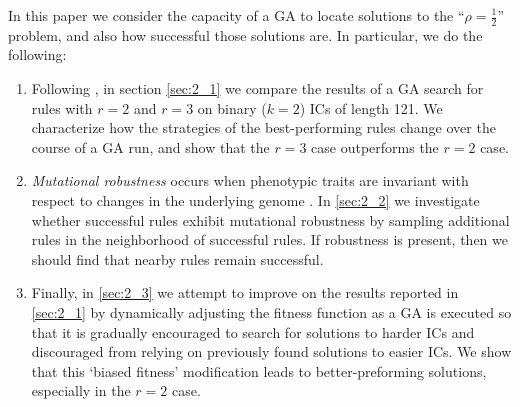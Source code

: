 In this paper we consider the capacity of a GA to locate solutions to the ``$\rho = \frac{1}{2}$'' problem, and also how successful those solutions are. In particular, we do the following: 
\begin{enumerate}
	\item Following \cite{Mitchell:1994:ECA:186092.186116}, in section \ref{sec:2_1} we compare the results of a GA search for rules 
	with $r = 2$ and $r = 3$ on binary ($k = 2$) 
	ICs of length 121. We characterize how the strategies of the best-performing rules change over the course of a GA run, 
	and show that the $r = 3$ case outperforms the $r = 2$ case.
	\item \textit{Mutational robustness} occurs when phenotypic traits are invariant with respect to changes in the underlying genome \cite{wagner_role_2012}.  
	In \ref{sec:2_2} we investigate whether successful rules exhibit mutational robustness by sampling additional rules in the neighborhood of successful rules. If robustness is present, then we should find that nearby rules remain successful.
	\item Finally, in \ref{sec:2_3} we attempt to improve on the results reported in \ref{sec:2_1} by dynamically adjusting the fitness function as a GA  
	is executed so that it is gradually encouraged to search for solutions to harder ICs and discouraged from relying on previously found 
	solutions to easier ICs. We show that this `biased fitness' 
	modification leads to better-preforming solutions, especially in the $r = 2$ case. 
\end{enumerate}








